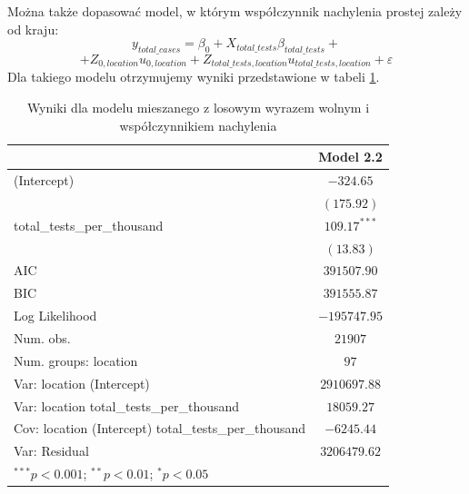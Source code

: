 \documentclass[12pt]{mwbk}
\theoremstyle{plain}
\theoremstyle{definition}
\theoremstyle{definition}
\begin{document}
\noindent Można także dopasować model, w którym współczynnik nachylenia prostej zależy od kraju:
$$y_{total\_ cases}=\beta_0 + X_{total\_tests}\beta_{total\_ tests}+$$
$$+Z_{0,location}u_{0,location}+Z_{total\_tests, location}u_{total\_tests, location}+\varepsilon$$
Dla takiego modelu otrzymujemy wyniki przedstawione w tabeli \ref{table:mod2-1}.
\newpage
\begin{table}[!h]
\begin{center}
	\begin{tabular}{l c}
		\hline
		& Model 2.2 \\
		\hline
		(Intercept)                                           & $-324.65$      \\
		& $(175.92)$     \\
		total\_tests\_per\_thousand                           & $109.17^{***}$ \\
		& $(13.83)$      \\
		\hline
		AIC                                                   & $391507.90$    \\
		BIC                                                   & $391555.87$    \\
		Log Likelihood                                        & $-195747.95$   \\
		Num. obs.                                             & $21907$        \\
		Num. groups: location                                 & $97$           \\
		Var: location (Intercept)                             & $2910697.88$   \\
		Var: location total\_tests\_per\_thousand             & $18059.27$     \\
		Cov: location (Intercept) total\_tests\_per\_thousand & $-6245.44$     \\
		Var: Residual                                         & $3206479.62$   \\
		\hline
		\multicolumn{2}{l}{\scriptsize{$^{***}p<0.001$; $^{**}p<0.01$; $^{*}p<0.05$}}
	\end{tabular}
	\caption{Wyniki dla modelu mieszanego z losowym wyrazem wolnym i współczynnikiem nachylenia}
	\label{table:mod2-1}
\end{center}
\end{table}
\end{document}
